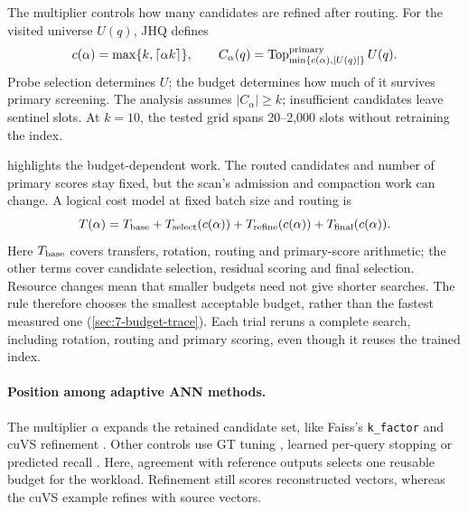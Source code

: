 The multiplier controls how many candidates are refined after routing.
For the visited universe $U(q)$, JHQ defines \cite{jhq}
\begin{equation}
 c(\alpha)=\max\{k,\lceil\alpha k\rceil\},\qquad
 C_\alpha(q)=\operatorname{Top}^{\rm primary}_{\min\{c(\alpha),|U(q)|\}}U(q).
 \label{eq:6-budget}
\end{equation}
Probe selection determines $U$; the budget determines how much of it
survives primary screening. The analysis assumes $|C_\alpha|\geq k$;
insufficient candidates leave sentinel slots. At $k=10$, the tested
grid spans 20--2,000 slots without retraining the index.

 highlights the budget-dependent work. The routed
candidates and number of primary scores stay fixed, but the scan's
admission and compaction work can change. A logical cost model at fixed
batch size and routing is
\begin{equation}
 T(\alpha)=T_{\rm base}+T_{\rm select}(c(\alpha))+
 T_{\rm refine}(c(\alpha))+T_{\rm final}(c(\alpha)).
 \label{eq:6-cost-model}
\end{equation}
Here $T_{\rm base}$ covers transfers, rotation, routing and primary-score
arithmetic; the other terms cover candidate selection, residual scoring
and final selection. Resource changes mean that smaller budgets need
not give shorter searches. The rule therefore chooses the smallest
acceptable budget, rather than the fastest measured one
(\cref{sec:7-budget-trace}). Each trial reruns a complete search,
including rotation, routing and primary scoring, even though it reuses
the trained index.

\paragraph{Position among adaptive ANN methods.}
The multiplier $\alpha$ expands the retained candidate set, like Faiss's
\texttt{k\_factor} and cuVS refinement \cite{faiss_refine,cuvs_refinement}.
Other controls use GT tuning \cite{faiss_autotune}, learned per-query
stopping \cite{li_termination} or predicted recall \cite{darth}. Here,
agreement with reference outputs selects one reusable budget for the
workload. Refinement still scores reconstructed vectors, whereas the
cuVS example refines with source vectors.

